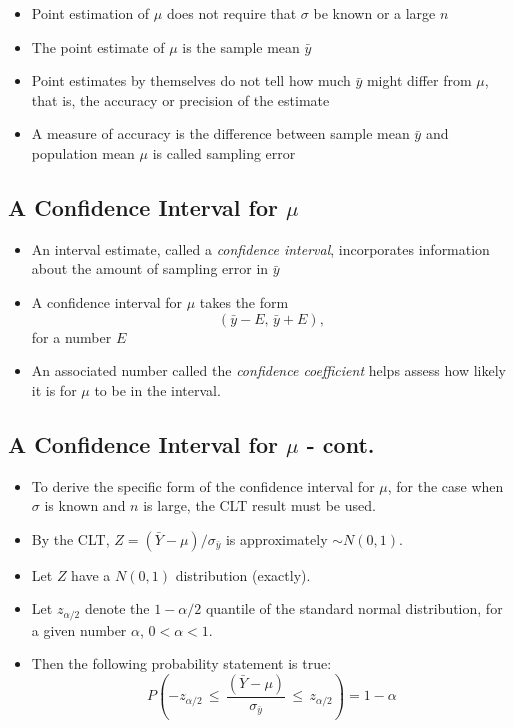 \documentclass[
  letterpaper,
  DIV=11,
  numbers=noendperiod]{scrartcl}
\begin{document}
\begin{itemize}
\item
  Point estimation of \(\mu\) does not require that \(\sigma\) be known
  or a large \(n\)
\item
  The point estimate of \(\mu\) is the sample mean \(\bar{y}\)
\item
  Point estimates by themselves do not tell how much \(\bar{y}\) might
  differ from \(\mu\), that is, the accuracy or precision of the
  estimate
\item
  A measure of accuracy is the difference between sample mean
  \(\bar{y}\) and population mean \(\mu\) is called {sampling error}
\end{itemize}

\subsection{\texorpdfstring{A Confidence Interval for
\(\mu\)}{A Confidence Interval for \textbackslash mu}}\label{a-confidence-interval-for-mu}

\begin{itemize}
\item
  An interval estimate, called a {\emph{confidence interval}},
  incorporates information about the amount of sampling error in
  \(\bar{y}\)
\item
  A {confidence interval} for \(\mu\) takes the form
  \[(\bar{y} - E,\, \bar{y} + E),\] for a number \(E\)
\item
  An associated number called the {\emph{confidence coefficient}} helps
  assess how likely it is for \(\mu\) to be in the interval.
\end{itemize}

\subsection{\texorpdfstring{A Confidence Interval for \(\mu\) -
cont.}{A Confidence Interval for \textbackslash mu - cont.}}\label{a-confidence-interval-for-mu---cont.}

\begin{itemize}
\item
  To derive the specific form of the confidence interval for \(\mu\),
  for the case {when \(\sigma\) is known and \(n\) is large}, the CLT
  result must be used.
\item
  By the CLT, \(Z = (\bar{Y} - \mu)/\sigma_{\bar{y}}\) is approximately
  \(\sim N(0, 1)\).
\item
  Let \(Z\) have a \(N(0, 1)\) distribution (exactly).
\item
  Let \(z_{\alpha/2}\) denote the \(1 - \alpha/2\) quantile of the
  standard normal distribution, for a given number \(\alpha\),
  \(0 < \alpha < 1\).
\item
  Then the following probability statement is true:
  \[P\left (-z_{\alpha/2}\, \leq\, \frac{(\bar{Y} - \mu)}{
            \sigma_{\bar{y}}}\, \leq\, z_{\alpha/2}\right ) = 1 - \alpha\]
\end{itemize}
\end{document}
